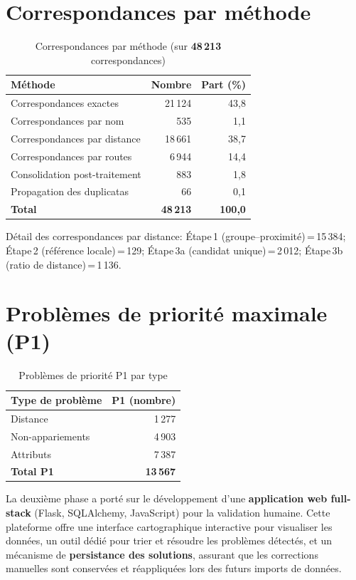 \section*{Correspondances par méthode}
\begin{table}[h]
\centering
\caption{Correspondances par méthode (sur \textbf{48\,213} correspondances)}
\label{tab:matches_by_method_conclusion}
\begin{tabular}{|l|r|r|}
\hline
\textbf{Méthode} & \textbf{Nombre} & \textbf{Part (\%)} \\
\hline
Correspondances exactes & 21\,124 & 43,8 \\
Correspondances par nom & 535 & 1,1 \\
Correspondances par distance & 18\,661 & 38,7 \\
Correspondances par routes & 6\,944 & 14,4 \\
Consolidation post-traitement & 883 & 1,8 \\
Propagation des duplicatas & 66 & 0,1 \\
\hline
\textbf{Total} & \textbf{48\,213} & \textbf{100,0} \\
\hline
\end{tabular}
\end{table}

\noindent\small Détail des correspondances par distance: Étape\,1 (groupe–proximité)\,=\,15\,384; Étape\,2 (référence locale)\,=\,129; Étape\,3a (candidat unique)\,=\,2\,012; Étape\,3b (ratio de distance)\,=\,1\,136.

\vspace{0.5em}
\section*{Problèmes de priorité maximale (P1)}
\begin{table}[h]
\centering
\caption{Problèmes de priorité P1 par type}
\label{tab:p1_problems_conclusion}
\begin{tabular}{|l|r|}
\hline
\textbf{Type de problème} & \textbf{P1 (nombre)} \\
\hline
Distance & 1\,277 \\
Non-appariements & 4\,903 \\
Attributs & 7\,387 \\
\hline
\textbf{Total P1} & \textbf{13\,567} \\
\hline
\end{tabular}
\end{table}

La deuxième phase a porté sur le développement d'une \textbf{application web full-stack} (Flask, SQLAlchemy, JavaScript) pour la validation humaine. Cette plateforme offre une interface cartographique interactive pour visualiser les données, un outil dédié pour trier et résoudre les problèmes détectés, et un mécanisme de \textbf{persistance des solutions}, assurant que les corrections manuelles sont conservées et réappliquées lors des futurs imports de données.


